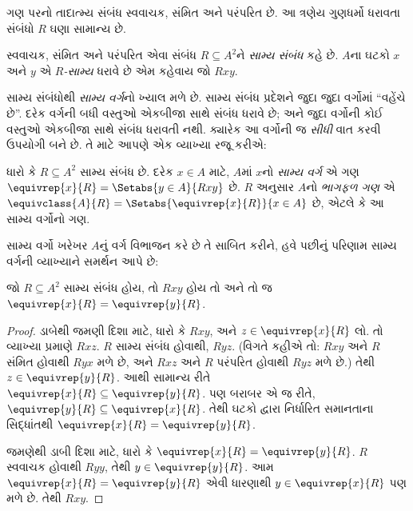 \label{guunit:OLP-0015}


ગણ પરનો તાદાત્મ્ય સંબંધ સ્વવાચક, સંમિત અને પરંપરિત છે.
આ ત્રણેય ગુણધર્મો ધરાવતા સંબંધો $R$ ઘણા સામાન્ય છે.

\begin{defn}[સામ્ય સંબંધ]
સ્વવાચક, સંમિત અને પરંપરિત એવા સંબંધ $R \subseteq A^2$ને
\emph{સામ્ય સંબંધ} કહે છે. $A$ના ઘટકો $x$ અને $y$
એ \emph{$R$-સામ્ય} ધરાવે છે એમ કહેવાય જો $Rxy$.
\end{defn}

સામ્ય સંબંધોથી \emph{સામ્ય વર્ગ}નો ખ્યાલ મળે છે.
સામ્ય સંબંધ પ્રદેશને જુદા જુદા વર્ગોમાં “વહેંચે છે”.
દરેક વર્ગની બધી વસ્તુઓ એકબીજા સાથે સંબંધ ધરાવે છે;
અને જુદા વર્ગોની કોઈ વસ્તુઓ એકબીજા સાથે સંબંધ ધરાવતી નથી.
ક્યારેક આ વર્ગોની જ \emph{સીધી} વાત કરવી ઉપયોગી બને છે.
તે માટે આપણે એક વ્યાખ્યા રજૂ કરીએ:

\begin{defn}
ધારો કે $R \subseteq A^2$ સામ્ય સંબંધ છે. દરેક $x \in A$
માટે, $A$માં $x$નો \emph{સામ્ય વર્ગ} એ ગણ
$\equivrep{x}{R} = \Setabs{y \in A}{Rxy}$ છે.
$R$ અનુસાર $A$નો \emph{ભાગફળ ગણ} એ
$\equivclass{A}{R} = \Setabs{\equivrep{x}{R}}{x \in A}$ છે,
એટલે કે આ સામ્ય વર્ગોનો ગણ.
\end{defn}

સામ્ય વર્ગો ખરેખર $A$નું વર્ગ વિભાજન કરે છે તે સાબિત કરીને,
હવે પછીનું પરિણામ સામ્ય વર્ગની વ્યાખ્યાને સમર્થન આપે છે:

\begin{prop}
જો $R \subseteq A^2$ સામ્ય સંબંધ હોય, તો $Rxy$ હોય
તો અને તો જ $\equivrep{x}{R} = \equivrep{y}{R}$.
\end{prop}

\begin{proof}
ડાબેથી જમણી દિશા માટે, ધારો કે $Rxy$, અને
$z \in \equivrep{x}{R}$ લો. તો વ્યાખ્યા પ્રમાણે $Rxz$.
$R$ સામ્ય સંબંધ હોવાથી, $Ryz$. (વિગતે કહીએ તો:
$Rxy$ અને $R$ સંમિત હોવાથી $Ryx$ મળે છે, અને
$Rxz$ અને $R$ પરંપરિત હોવાથી $Ryz$ મળે છે.)
તેથી $z \in \equivrep{y}{R}$. આથી સામાન્ય રીતે
$\equivrep{x}{R} \subseteq \equivrep{y}{R}$.
પણ બરાબર એ જ રીતે,
$\equivrep{y}{R} \subseteq \equivrep{x}{R}$.
તેથી ઘટકો દ્વારા નિર્ધારિત સમાનતાના સિદ્ધાંતથી
$\equivrep{x}{R} = \equivrep{y}{R}$.

જમણેથી ડાબી દિશા માટે, ધારો કે
$\equivrep{x}{R} = \equivrep{y}{R}$.
$R$ સ્વવાચક હોવાથી $Ryy$, તેથી $y \in \equivrep{y}{R}$.
આમ $\equivrep{x}{R} = \equivrep{y}{R}$ એવી ધારણાથી
$y \in \equivrep{x}{R}$ પણ મળે છે. તેથી $Rxy$.
\end{proof}

